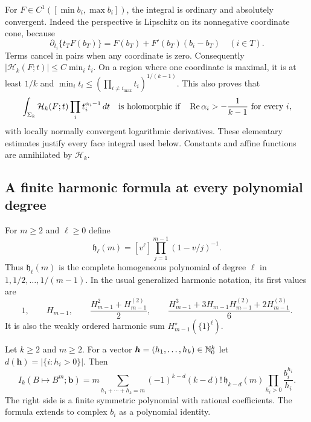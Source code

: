 For $F\in C^1([\min b_i,\max b_i])$, the integral is ordinary and
absolutely convergent.  Indeed the perspective is Lipschitz on its
nonnegative coordinate cone, because
\[
 \partial_{t_i}\{t_TF(b_T)\}
      =F(b_T)+F'(b_T)(b_i-b_T)\quad(i\in T).
\]
Terms cancel in pairs when any coordinate is zero.  Consequently
$|\mathcal H_k(F;t)|\le C\min_i t_i$.  On a region where one
coordinate is maximal, it is at least $1/k$ and
$\min_i t_i\le(\prod_{i\ne i_{\max}}t_i)^{1/(k-1)}$.
This also proves that
\begin{equation}\label{sfj:eq:normal-face-domain}
 \int_{\Sigma_k}\mathcal H_k(F;t)\prod_i t_i^{\alpha_i-1}\,dt
 \quad\hbox{is holomorphic if}\quad
 \operatorname{Re}\alpha_i>-\frac1{k-1}\ \hbox{for every }i,
\end{equation}
with locally normally convergent logarithmic derivatives.  These
elementary estimates justify every face integral used below.  Constants
and affine functions are annihilated by $\mathcal H_k$.

\subsection{A finite harmonic formula at every polynomial degree}

For $m\ge2$ and $\ell\ge0$ define
\begin{equation}\label{sfj:eq:complete-harmonic}
 \mathfrak h_\ell(m)
  =[v^\ell]\prod_{j=1}^{m-1}(1-v/j)^{-1}.
\end{equation}
Thus $\mathfrak h_\ell(m)$ is the complete homogeneous polynomial
of degree $\ell$ in $1,1/2,\ldots,1/(m-1)$.  In the usual generalized
harmonic notation, its first values are
\[
 1,\qquad H_{m-1},\qquad
 \frac{H_{m-1}^2+H_{m-1}^{(2)}}2,\qquad
 \frac{H_{m-1}^3+3H_{m-1}H_{m-1}^{(2)}+2H_{m-1}^{(3)}}6.
\]
It is also the weakly ordered harmonic sum
$H_{m-1}^{\star}(\{1\}^{\ell})$.

\begin{theorem}
\label{sfj:thm:monomial}
Let $k\ge2$ and $m\ge2$.  For a vector
$\boldsymbol h=(h_1,\ldots,h_k)\in\mathbb N_0^k$ let
$d(\boldsymbol h)=|\{i:h_i>0\}|$.  Then
\begin{equation}\label{sfj:eq:monomial}
 \boxed{\displaystyle
 I_k(B\mapsto B^m;\boldsymbol b)
  =m\!\sum_{h_1+\cdots+h_k=m}
   (-1)^{k-d}(k-d)!\,\mathfrak h_{k-d}(m)
                  \prod_{h_i>0}\frac{b_i^{h_i}}{h_i}.}
\end{equation}
The right side is a finite symmetric polynomial with rational
coefficients.  The formula extends to complex $b_i$ as a polynomial
identity.
\end{theorem}

